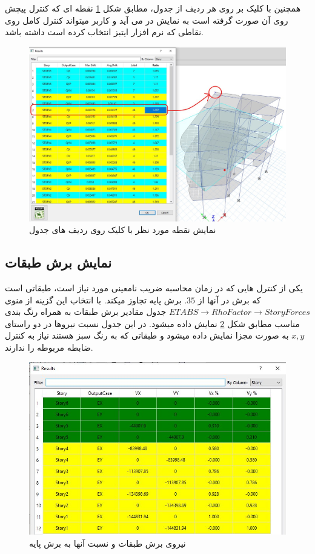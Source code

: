همچنین با کلیک بر روی هر ردیف از جدول، مطابق شکل 
\ref{pic:torsion_show_node}
نقطه ای که کنترل پیچش روی آن صورت گرفته است به نمایش در می آید و کاربر میتواند کنترل کامل روی نقاطی
که نرم افزار ایتبز انتخاب کرده است داشته باشد.

\begin{figure}[H]
    \centering
    \includegraphics[scale=0.4]{figures/torsion_show_node}
    \caption{نمایش نقطه مورد نظر با کلیک روی ردیف های جدول}
    \label{pic:torsion_show_node}
\end{figure}

\subsection{نمایش برش طبقات}
یکی از کنترل هایی که در زمان محاسبه ضریب نامعینی مورد نیاز است، طبقاتی است که برش در آنها از $.35$ 
برش پایه تجاوز میکند. با انتخاب این گزینه از منوی 
$ETABS \rightarrow Rho Factor \rightarrow Story Forces$
جدول مقادیر برش طبقات به همراه رنگ بندی مناسب مطابق شکل 
\ref{pic:story_forces}
نمایش داده میشود. در این جدول نسبت نیروها در دو راستای
$x, y$
به صورت مجزا نمایش داده میشود و طبقاتی که به رنگ سبز هستند نیاز به کنترل ضابطه مربوطه را ندارند.

\begin{figure}[H]
    \centering
    \includegraphics[scale=0.7]{figures/story_forces}
    \caption{نیروی برش طبقات و نسبت آنها به برش پایه}
    \label{pic:story_forces}
\end{figure}

